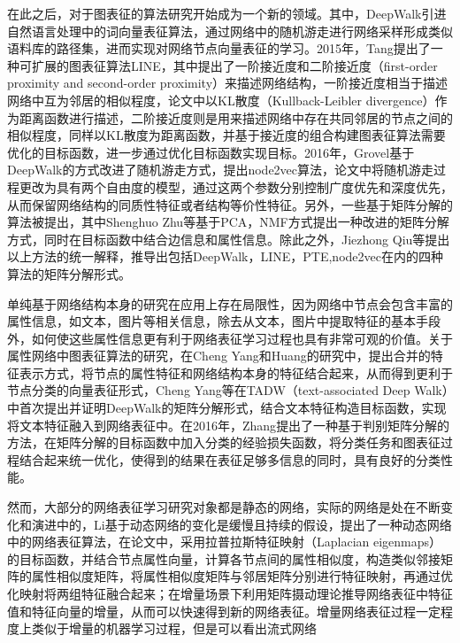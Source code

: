 在此之后，对于图表征的算法研究开始成为一个新的领域。其中，DeepWalk\cite{perozzi2014deepwalk}引进自然语言处理中的词向量表征算法，通过网络中的随机游走进行网络采样形成类似语料库的路径集，进而实现对网络节点向量表征的学习。2015年，Tang\cite{tang2015line}提出了一种可扩展的图表征算法LINE，其中提出了一阶接近度和二阶接近度（first-order proximity and second-order proximity）来描述网络结构，一阶接近度相当于描述网络中互为邻居的相似程度，论文中以KL散度（Kullback-Leibler divergence）作为距离函数进行描述，二阶接近度则是用来描述网络中存在共同邻居的节点之间的相似程度，同样以KL散度为距离函数，并基于接近度的组合构建图表征算法需要优化的目标函数，进一步通过优化目标函数实现目标。2016年，Grovel\cite{grover2016node2vec}基于DeepWalk的方式改进了随机游走方式，提出node2vec算法，论文中将随机游走过程更改为具有两个自由度的模型，通过这两个参数分别控制广度优先和深度优先，从而保留网络结构的同质性特征或者结构等价性特征。另外，一些基于矩阵分解的算法\cite{ahmed2013distributed,singh2008relational,zhu2007combining}被提出，其中Shenghuo Zhu等基于PCA，NMF方式提出一种改进的矩阵分解方式，同时在目标函数中结合边信息和属性信息。除此之外，Jiezhong Qiu等\cite{qiu2017network}提出以上方法的统一解释，推导出包括DeepWalk，LINE，PTE\cite{tang2015pte},node2vec在内的四种算法的矩阵分解形式。

单纯基于网络结构本身的研究在应用上存在局限性，因为网络中节点会包含丰富的属性信息，如文本，图片等相关信息，除去从文本，图片中提取特征的基本手段外，如何使这些属性信息更有利于网络表征学习过程也具有非常可观的价值。关于属性网络中图表征算法的研究，在Cheng Yang\cite{yang2015network}和Huang\cite{huang2017accelerated}的研究中，提出合并的特征表示方式，将节点的属性特征和网络结构本身的特征结合起来，从而得到更利于节点分类的向量表征形式，Cheng Yang等在TADW（text-associated Deep Walk）中首次提出并证明DeepWalk的矩阵分解形式，结合文本特征构造目标函数，实现将文本特征融入到网络表征中。在2016年，Zhang\cite{zhang2016collective}提出了一种基于判别矩阵分解的方法，在矩阵分解的目标函数中加入分类的经验损失函数，将分类任务和图表征过程结合起来统一优化，使得到的结果在表征足够多信息的同时，具有良好的分类性能。

然而，大部分的网络表征学习研究对象都是静态的网络，实际的网络是处在不断变化和演进中的，Li\cite{li2017attributed}基于动态网络的变化是缓慢且持续的假设，提出了一种动态网络中的网络表征算法，在论文中，采用拉普拉斯特征映射（Laplacian eigenmaps）的目标函数，并结合节点属性向量，计算各节点间的属性相似度，构造类似邻接矩阵的属性相似度矩阵，将属性相似度矩阵与邻居矩阵分别进行特征映射，再通过优化映射将两组特征融合起来；在增量场景下利用矩阵摄动理论推导网络表征中特征值和特征向量的增量，从而可以快速得到新的网络表征。增量网络表征过程一定程度上类似于增量的机器学习过程，但是可以看出流式网络

